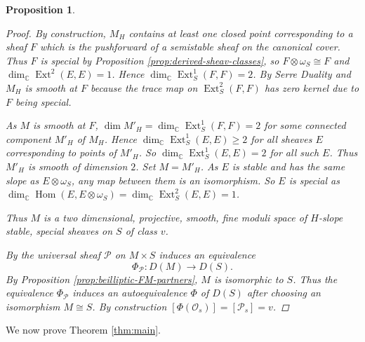 \documentclass[a4paper, 12pt, twoside]{amsart}
\theoremstyle{plain}
\newtheorem{proposition}[theorem]{Proposition}
\theoremstyle{definition}
\DeclareMathOperator{\Ext}{Ext}
\DeclareMathOperator{\Hom}{Hom}
\DeclareMathOperator{\iso}{\cong}
\DeclareMathOperator{\C}{\mathbb{C}}
\begin{document}
\begin{proposition}
\begin{proof}
    By construction, $M_H$ contains at least one closed point
    corresponding to a sheaf $F$ which is the pushforward of a
    semistable sheaf on the canonical cover. Thus $F$ is special by
    Proposition \ref{prop:derived-sheav-classes}, so
    $F \otimes \omega_S \iso F$ and $\dim_{\C}\Ext^2(E,E) = 1$. Hence
    $\dim_{\C}\Ext_S^1(F,F) = 2$. By Serre Duality and \cite[\S
    4.5]{MR2665168} $M_H$ is smooth at $F$ because the trace map on
    $\Ext_S^2(F,F)$ has zero kernel due to $F$ being special.

    As $M$ is smooth at $F$, $\dim M'_H = \dim_{\C}\Ext_S^1(F,F) = 2$
    for some connected component $M'_H$ of $M_H$. Hence
    $\dim_{\C}\Ext_S^1(E,E) \geq 2$ for all sheaves $E$ corresponding
    to points of $M'_H$. So $\dim_{\C}\Ext^1_S(E,E) = 2$ for all such
    $E$. Thus $M'_H$ is smooth of dimension $2$. Set $M = M'_H$. As
    $E$ is stable and has the same slope as $E \otimes \omega_S$, any
    map between them is an isomorphism. So $E$ is special as
    $\dim_{\C}\Hom(E,E \otimes \omega_S) = \dim_{\C}\Ext^2_S(E,E) =
    1$.

    Thus $M$ is a two dimensional, projective, smooth, fine moduli
    space of $H$-slope stable, special sheaves on $S$ of class $v$.

    By \cite[Corollary 2.8]{MR1827500} the universal sheaf
    $\mathcal{P}$ on $M \times S$ induces an  equivalence
    \[
      \Phi_{\mathcal{P}} \colon D(M) \to D(S).
    \]
    By Proposition \ref{prop:beilliptic-FM-partners}, $M$ is
    isomorphic to $S$. Thus the equivalence $\Phi_{\mathcal{P}}$
    induces an autoequivalence $\Phi$ of $D(S)$ after choosing an
    isomorphism $M \iso S$. By construction
    $[\Phi(\mathcal{O}_s)] = [\mathcal{P}_s] = v$.
\end{proof}
\end{proposition}

We now prove Theorem \ref{thm:main}.
\end{document}
